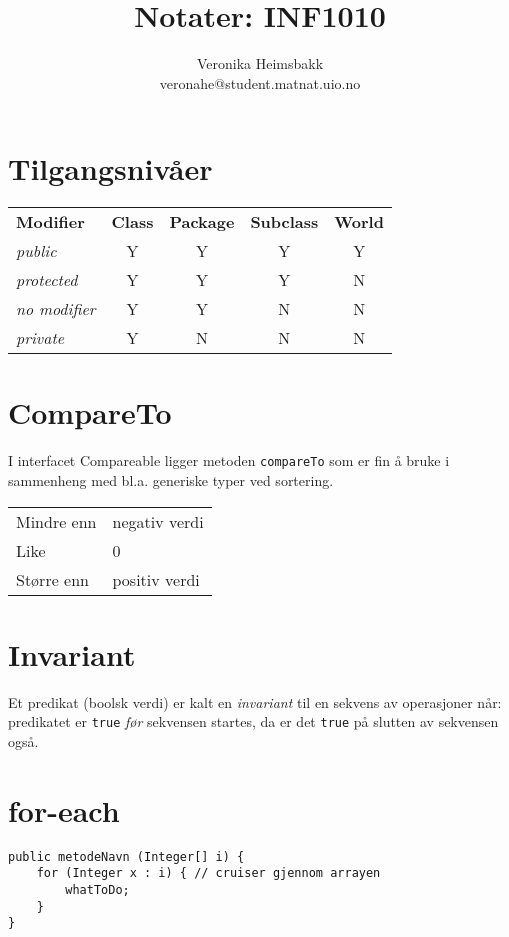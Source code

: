 \documentclass[10pt,a4paper]{article}
\title{Notater: INF1010}
\author{Veronika Heimsbakk \\ 
veronahe@student.matnat.uio.no}
\begin{document}
\maketitle{}

\section{Tilgangsnivåer}
\begin{center}
\begin{tabular}{l c c c c}
\textbf{Modifier} & \textbf{Class} & \textbf{Package} & \textbf{Subclass} & \textbf{World}\\
\textit{public} & Y & Y & Y & Y\\
\textit{protected} & Y & Y & Y & N\\
\textit{no modifier} & Y & Y & N & N\\
\textit{private} & Y & N & N & N\\
\end{tabular}
\end{center}

\section{CompareTo}
I interfacet Compareable ligger metoden \texttt{compareTo} som er fin å bruke i sammenheng med bl.a. generiske typer ved sortering.

\begin{center}
\begin{tabular}{ll}
Mindre enn & negativ verdi\\
Like & 0\\
Større enn & positiv verdi\\
\end{tabular}
\end{center}

\section{Invariant}
Et predikat (boolsk verdi) er kalt en \textit{invariant} til en sekvens av operasjoner når: predikatet er \texttt{true} \textit{før} sekvensen startes, da er det \texttt{true} på slutten av sekvensen også.

\section{for-each}
\begin{lstlisting}
public metodeNavn (Integer[] i) {
	for (Integer x : i) { // cruiser gjennom arrayen
		whatToDo;
	}
}
\end{lstlisting}
\end{document}
